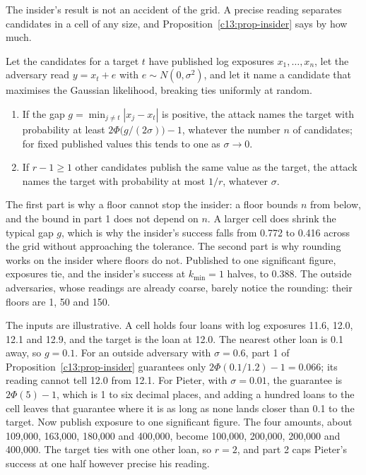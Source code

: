 The insider's result is not an accident of the grid. A precise reading separates
candidates in a cell of any size, and Proposition~\ref{c13:prop-insider} says by how
much.

\begin{proposition}\label{c13:prop-insider}
Let the candidates for a target $t$ have published log exposures $x_1,\dots,x_n$, let
the adversary read $y = x_t + e$ with $e \sim N(0,\sigma^2)$, and let it name a
candidate that maximises the Gaussian likelihood, breaking ties uniformly at random.
\begin{enumerate}
\item If the gap $g = \min_{j \ne t} |x_j - x_t|$ is positive, the attack names the
target with probability at least $2\Phi\bigl(g/(2\sigma)\bigr) - 1$, whatever the number $n$ of
candidates; for fixed published values this tends to one as $\sigma \to 0$.
\item If $r - 1 \ge 1$ other candidates publish the same value as the target, the
attack names the target with probability at most $1/r$, whatever $\sigma$.
\end{enumerate}
\end{proposition}

The first part is why a floor cannot stop the insider: a floor bounds $n$ from below,
and the bound in part 1 does not depend on $n$. A larger cell does shrink the typical
gap $g$, which is why the insider's success falls from 0.772 to 0.416 across the grid
without approaching the tolerance. The second part is why rounding works on the
insider where floors do not. Published to one significant figure, exposures tie, and
the insider's success at $k_{\min}=1$ halves, to 0.388. The outside adversaries,
whose readings are already coarse, barely notice the rounding: their floors are 1,
50 and 150.

\begin{example}\label{c13:ex-pieter}
The inputs are illustrative. A cell holds four loans with log exposures 11.6, 12.0, 12.1
and 12.9, and the target is the loan at 12.0. The nearest other loan is 0.1 away, so
$g = 0.1$. For an outside adversary with $\sigma = 0.6$, part 1 of
Proposition~\ref{c13:prop-insider} guarantees only $2\Phi(0.1/1.2) - 1 = 0.066$; its
reading cannot tell 12.0 from 12.1. For Pieter, with $\sigma = 0.01$, the guarantee is
$2\Phi(5) - 1$, which is 1 to six decimal places, and adding a hundred loans to the cell
leaves that guarantee where it is as long as none lands closer than 0.1 to the target.
Now publish exposure to one significant figure. The four amounts, about 109,000, 163,000,
180,000 and 400,000, become 100,000, 200,000, 200,000 and 400,000. The target ties with
one other loan, so $r = 2$, and part 2 caps Pieter's success at one half however precise
his reading.
\end{example}


